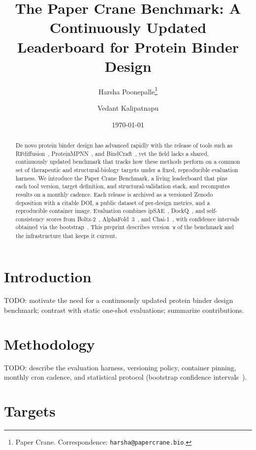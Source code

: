\documentclass[11pt]{article}
\title{The Paper Crane Benchmark: A Continuously Updated Leaderboard for Protein Binder Design}
\author{%
  Harsha Poonepalle\thanks{Paper Crane. Correspondence: \texttt{harsha@papercrane.bio}.}
  \and
  Vedant Kalipatnapu\footnotemark[1]%
}
\date{\today}
\begin{document}
\maketitle

\begin{abstract}
De novo protein binder design has advanced rapidly with the release of tools
such as RFdiffusion~\citep{watson2023rfdiffusion}, ProteinMPNN~\citep{dauparas2022proteinmpnn},
and BindCraft~\citep{pacesa2024bindcraft}, yet the field lacks a shared,
continuously updated benchmark that tracks how these methods perform on a
common set of therapeutic and structural-biology targets under a fixed,
reproducible evaluation harness. We introduce the Paper Crane Benchmark, a
living leaderboard that pins each tool version, target definition, and
structural-validation stack, and recomputes results on a monthly cadence. Each
release is archived as a versioned Zenodo deposition with a citable DOI, a
public dataset of per-design metrics, and a reproducible container image.
Evaluation combines ipSAE~\citep{dunbar2024ipsae}, DockQ~\citep{basu2016dockq},
and self-consistency scores from Boltz-2~\citep{passaro2025boltz2},
AlphaFold~3~\citep{abramson2024alphafold3}, and Chai-1~\citep{chai2024chai1},
with confidence intervals obtained via the bootstrap~\citep{efron1979bootstrap}.
This preprint describes version~\texttt{v\unskip} of the
benchmark and the infrastructure that keeps it current.
\end{abstract}

\section{Introduction}
\label{sec:introduction}

TODO: motivate the need for a continuously updated protein binder design
benchmark; contrast with static one-shot evaluations; summarize contributions.

\section{Methodology}
\label{sec:methodology}

TODO: describe the evaluation harness, versioning policy, container pinning,
monthly cron cadence, and statistical protocol (bootstrap confidence
intervals~\citep{efron1979bootstrap}).

\section{Targets}
\label{sec:targets}
\end{document}
